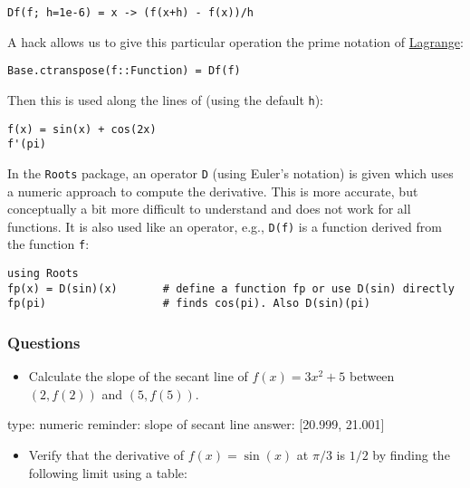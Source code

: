 \documentclass[12pt]{article}
\begin{document}
\begin{verbatim}
Df(f; h=1e-6) = x -> (f(x+h) - f(x))/h
\end{verbatim}
A hack allows us to give this particular operation the prime notation of
\href{http://en.wikipedia.org/wiki/Notation_for_differentiation}{Lagrange}:



\begin{verbatim}
Base.ctranspose(f::Function) = Df(f) 
\end{verbatim}
Then this is used along the lines of (using the default \texttt{h}):



\begin{verbatim}
f(x) = sin(x) + cos(2x)
f'(pi)  
\end{verbatim}
In the \texttt{Roots} package, an operator \texttt{D} (using Euler's
notation) is given which uses a numeric approach to compute the
derivative. This is more accurate, but conceptually a bit more difficult
to understand and does not work for all functions. It is also used like
an operator, e.g., \texttt{D(f)} is a function derived from the function
\texttt{f}:



\begin{verbatim}
using Roots
fp(x) = D(sin)(x)       # define a function fp or use D(sin) directly
fp(pi)                  # finds cos(pi). Also D(sin)(pi)
\end{verbatim}
\subsubsection{Questions}

\begin{itemize}
\itemsep1pt\parskip0pt
\item
  Calculate the slope of the secant line of $f(x) = 3x^2 + 5$ between
  $(2,f(2))$ and $(5, f(5))$.
\end{itemize}

\begin{answer}
    type: numeric
    reminder: slope of secant line
    answer: [20.999, 21.001]

\end{answer}

\begin{itemize}
\itemsep1pt\parskip0pt
\item
  Verify that the derivative of $f(x) = \sin(x)$ at $\pi/3$ is $1/2$ by
  finding the following limit using a table:
\end{itemize}
\end{document}
